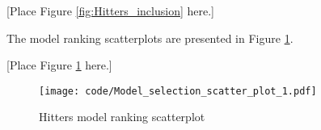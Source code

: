 \documentclass{amsart}[12pt]
\begin{document}
[Place Figure \ref{fig:Hitters_inclusion} here.]

The model ranking scatterplots are presented in Figure \ref{fig:Hitters_model_ranking}.

[Place Figure \ref{fig:Hitters_model_ranking} here.]

\begin{figure}[p]
	\texttt{[image: code/Model\_selection\_scatter\_plot\_1.pdf]}
	\caption{Hitters model ranking scatterplot}
	\label{fig:Hitters_model_ranking}
\end{figure}







\end{document}
